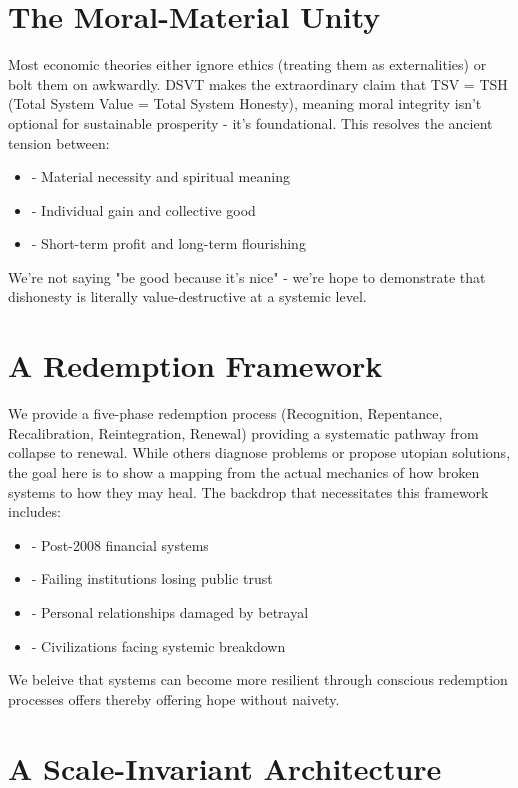 \documentclass[11pt,oneside]{book}
\begin{document}
\section{The Moral-Material Unity}

Most economic theories either ignore ethics (treating them as externalities) or bolt them on awkwardly. DSVT makes the extraordinary claim that TSV = TSH (Total System Value = Total System Honesty), meaning moral integrity isn't optional for sustainable prosperity - it's foundational. This resolves the ancient tension between:

\begin{itemize}
\item - Material necessity and spiritual meaning
\item - Individual gain and collective good
\item - Short-term profit and long-term flourishing
\end{itemize}

We're not saying "be good because it's nice" - we're hope to demonstrate that dishonesty is literally value-destructive at a systemic level.

\section{A Redemption Framework}

We provide a five-phase redemption process (Recognition, Repentance, Recalibration, Reintegration, Renewal) providing a systematic pathway from collapse to renewal.  While others diagnose problems or propose utopian solutions, the goal here is to show a mapping from the actual mechanics of how broken systems to how they may heal. The backdrop that necessitates this framework includes:

\begin{itemize}
\item - Post-2008 financial systems
\item - Failing institutions losing public trust
\item - Personal relationships damaged by betrayal
\item - Civilizations facing systemic breakdown
\end{itemize}

We beleive that systems can become more resilient through conscious redemption processes offers thereby offering hope without naivety.

\section{A Scale-Invariant Architecture}
\end{document}
